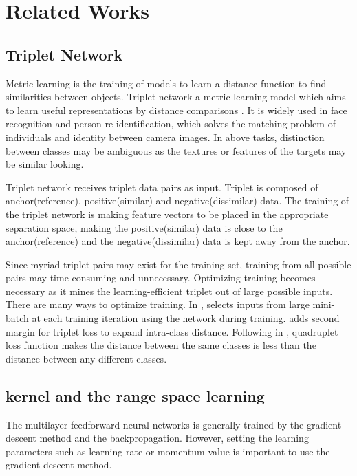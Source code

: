 \documentclass[runningheads]{llncs}
\begin{document}
\section{Related Works}

\subsection{Triplet Network}
Metric learning is the training of models to learn a distance function to find similarities between objects. 
Triplet network a metric learning model which aims to learn useful representations by distance comparisons \cite{hoffer2015deep}. It is widely used in face recognition \cite{schroff2015facenet} and person re-identification, which solves the matching problem of individuals and identity between camera images\cite{cheng2016person,chen2017beyond}. In above tasks, distinction between classes may be ambiguous as the textures or features of the targets may be similar looking.

Triplet network receives triplet data pairs as input. Triplet is composed of anchor(reference), positive(similar) and negative(dissimilar) data.
The training of the triplet network is making feature vectors to be placed in the appropriate separation space, making the positive(similar) data is close to the anchor(reference) and the negative(dissimilar) data is kept away from the anchor.
 
Since myriad triplet pairs may exist for the training set, training from all possible pairs may time-consuming and unnecessary. Optimizing training becomes necessary as it mines the learning-efficient triplet out of large possible inputs.
There are many ways to optimize training. In \cite{schroff2015facenet}, selects inputs from large mini-batch at each training iteration using the network during training. \cite{cheng2016person} adds second margin for triplet loss to expand intra-class distance.
Following in \cite{chen2017beyond}, quadruplet loss function makes the distance between the same classes is less than the distance between any different classes. 

\subsection{kernel and the range space learning}\label{kar}

The multilayer feedforward neural networks is generally trained by the gradient descent method and the backpropagation.
However, setting the learning parameters such as learning rate or momentum value is important to use the gradient descent method. 
\end{document}
